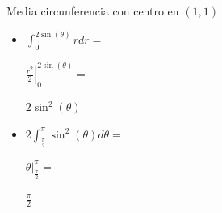 \documentclass[../practica_09.tex]{subfiles}
\begin{document}
\begin{enumerate}
            Media circunferencia con centro en $(1,1)$

            \begin{itemize}
                \item $\int_0^{2\sin(\theta)} r dr = $
                
                    $ \left. \frac{r^2}{2} \right |_0^{2\sin(\theta)} = $

                    $ 2\sin^2(\theta) $

                \item $2 \int_{\frac{\pi}{2}}^{\pi} \sin^2(\theta) d\theta = $
                
                    $ \left. \theta  \right |_{\frac{\pi}{2}}^{\pi} = $

                    $ \frac{\pi}{2} $

            \end{itemize}

    \end{enumerate}
\end{document}
